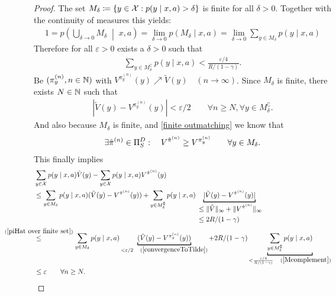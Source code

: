\begin{proof}
	The set \(M_\delta\coloneqq \{y\in\mathcal{X} : p(y\mid x,a)>\delta \} \) is finite for all \(\delta>0\). Together with the continuity of measures this yields:
	\begin{align*}
		1=p\left(\bigcup_{\delta \to 0} M_\delta \;\middle|\; x, a \right)
		= \lim_{\delta\to 0} p(M_\delta\mid x,a)
		=\lim_{\delta\to 0} \sum_{y\in M_\delta} p(y\mid x,a)
	\end{align*}
	Therefore for all \(\varepsilon >0\) exists a \(\delta>0\) such that
	\begin{align}
		\sum_{y\in M_\delta^\complement}p(y\mid x,a) < \frac{\varepsilon /4}{R/(1-\gamma)}.
		\label{Mcomplement}
	\end{align}
	Be \((\pi_y^{(n)},n\in\mathbb{N} )\) with \(V^{\pi_y^{(n)}}(y) \nearrow \tilde{V}(y) \quad (n\to\infty) \). Since \(M_\delta\) is finite, there exists \(N\in\mathbb{N} \) such that
	\begin{align}
		|\tilde{V}(y) -V^{\pi_y^{(n)}}(y)|< \varepsilon/2
		\qquad \forall n\ge N, \forall y\in M_\delta^\complement.
		\label{convergenceToTilde}
	\end{align}
	And also because \(M_\delta \) is finite, and \ref{finite outmatching} we know that
	\begin{align}
	\exists\hat{\pi}^{(n)}\in\Pi_S^D : 
	\quad {V^{\hat{\pi}^{(n)}}\ge V^{\pi_y^{(n)}}}
	\qquad \forall y\in M_\delta.
	\label{piHat over finite set}
	\end{align}
	This finally implies
	\begin{align*}
		&\sum_{y\in\cX}p(y\mid x,a)\tilde{V}(y) 
		- \sum_{y\in\cX}p(y\mid x,a) V^{\hat{\pi}^{(n)}}(y) \\
		&\le \sum_{y\in M_\delta}p(y\mid x,a) (\tilde{V}(y) - V^{\hat{\pi}^{(n)}}(y))
		+ \sum_{y\in M_\delta^\complement}p(y\mid x,a) 
		\underbracket[1pt]{|\tilde{V}(y) - V^{\hat{\pi}^{(n)}}(y)|}_{
			\begin{aligned}
				&\le \|\tilde{V}\|_\infty + \| V^{\hat{\pi}^{(n)}}\|_\infty\\
				&\le 2R/(1-\gamma)
			\end{aligned}
		} \\
		&\lxlq{(\ref{piHat over finite set})} \sum_{y\in M_\delta}p(y\mid x,a) 
		\underbracket[1pt]{(\tilde{V}(y) - V^{\pi_y^{(n)}}(y))}_{
			<\varepsilon/2\quad(\ref{convergenceToTilde})
		}
		+ 2R/(1-\gamma) \underbracket[1pt]{\sum_{y\in M_\delta^\complement}p(y\mid x,a)}_{
			< \frac{\varepsilon /4}{R/(1-\gamma)}\quad(\ref{Mcomplement})
		}\\
		&\le \varepsilon \qquad \forall n\ge N.

\end{align*}
\end{proof}
